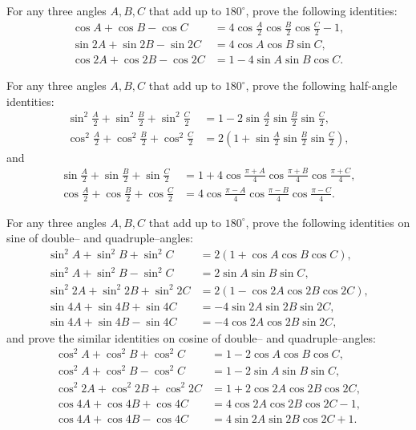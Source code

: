 \begin{question}
    For any three angles $A,B,C$ that add up to $180^\circ$, prove the following identities:
    \begin{align*}
        \cos A + \cos B - \cos C &= 4\cos \frac{A}{2}\cos \frac{B}{2}\cos \frac{C}{2}-1,\\
        \sin 2A +\sin 2B - \sin 2C &= 4\cos A \cos B \sin C,\\
        \cos 2A +\cos 2B - \cos 2C &= 1 - 4\sin A \sin B \cos C.
    \end{align*}
\end{question}


\begin{question}
    For any three angles $A,B,C$ that add up to $180^\circ$, prove the following half-angle identities:
    \begin{align*}
        \sin^2 \frac{A}{2} + \sin^2 \frac{B}{2} + \sin^2 \frac{C}{2} &= 1 - 2\sin\frac{A}{2}\sin\frac{B}{2}\sin\frac{C}{2},\\
        \cos^2 \frac{A}{2} + \cos^2 \frac{B}{2} + \cos^2 \frac{C}{2} &= 2\left(1 + \sin\frac{A}{2}\sin\frac{B}{2}\sin\frac{C}{2}\right),
    \end{align*}
    and
    \begin{align*}
        \sin \frac{A}{2} + \sin \frac{B}{2} + \sin \frac{C}{2} &= 1 + 4 \cos\frac{\pi+A}{4}\cos\frac{\pi+B}{4}\cos\frac{\pi+C}{4},\\
        \cos \frac{A}{2} + \cos \frac{B}{2} + \cos \frac{C}{2} &= 4\cos\frac{\pi-A}{4}\cos\frac{\pi-B}{4}\cos\frac{\pi-C}{4}.
    \end{align*}
\end{question}


\begin{question}
    For any three angles $A,B,C$ that add up to $180^\circ$, prove the following identities on sine of double-- and quadruple--angles:
    \begin{align*}
        \sin^2 A + \sin^2 B + \sin^2 C &= 2 (1+\cos A \cos B \cos C),\\
        \sin^2 A + \sin^2 B - \sin^2 C &= 2 \sin A \sin B \sin C,\\
        \sin^2 2A + \sin^2 2B + \sin^2 2C &= 2 (1-\cos 2A \cos 2B \cos 2C),\\
        \sin 4A + \sin 4B + \sin 4C &= -4\sin 2A \sin 2B \sin 2C,\\
        \sin 4A + \sin 4B - \sin 4C &= -4\cos 2A \cos 2B \sin 2C,
    \end{align*}
    and prove the similar identities on cosine of double-- and quadruple--angles:
    \begin{align*}
        \cos^2 A + \cos^2 B + \cos^2 C &= 1-2\cos A \cos B \cos C,\\
        \cos^2 A + \cos^2 B - \cos^2 C &= 1-2\sin A \sin B \sin C,\\
        \cos^2 2A + \cos^2 2B + \cos^2 2C &= 1+2\cos 2A \cos 2B \cos 2C,\\
        \cos 4A + \cos 4B + \cos 4C &= 4\cos 2A \cos 2B \cos 2C - 1,\\
        \cos 4A + \cos 4B - \cos 4C &= 4\sin 2A \sin 2B \cos 2C + 1.
    \end{align*}
\end{question}

